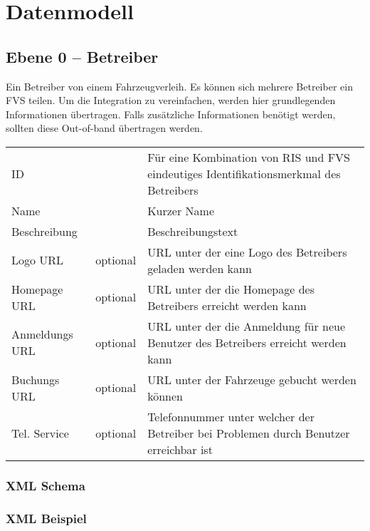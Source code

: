 \chapter{Datenmodell}
\label{sec:Datenmodell}

\section{Ebene 0 -- Betreiber}
Ein Betreiber von einem Fahrzeugverleih. Es können sich mehrere Betreiber ein FVS teilen. Um die Integration zu vereinfachen, werden hier grundlegenden Informationen übertragen. Falls zusätzliche Informationen benötigt werden, sollten diese Out-of-band übertragen werden.

\begin{flushleft}
\begin{tabularx}{\linewidth}{l>{\raggedright\arraybackslash}l>{\raggedright\arraybackslash}X} 
\toprule
ID & & Für eine Kombination von RIS und FVS eindeutiges Identifikationsmerkmal des Betreibers \\
Name & & Kurzer Name \\
Beschreibung & & Beschreibungstext \\
Logo URL & optional & URL unter der eine Logo des Betreibers geladen werden kann \\
Homepage URL & optional & URL unter der die Homepage des Betreibers erreicht werden kann \\
Anmeldungs URL & optional & URL unter der die Anmeldung für neue Benutzer des Betreibers erreicht werden kann \\
Buchungs URL & optional & URL unter der Fahrzeuge gebucht werden können \\
Tel. Service & optional & Telefonnummer unter welcher der Betreiber bei Problemen durch Benutzer erreichbar ist \\
\bottomrule
\end{tabularx}
\end{flushleft}

\subsection{XML Schema}


\subsection{XML Beispiel}

